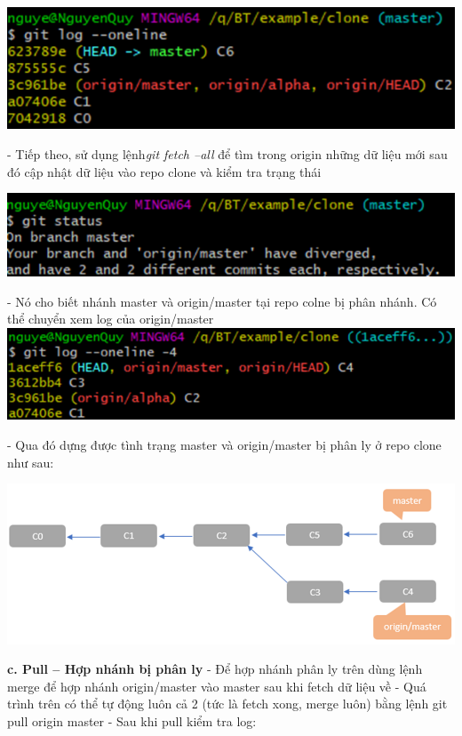 \documentclass[12pt,a4paper]{report}
\begin{document}
 	\label{fig:screenshot071}
 \vskip 0.4cm\vskip 0.4cm
 	\includegraphics[width=0.8\linewidth]{screenshot072}
 
 	\label{fig:screenshot072}
\vskip 0.4cm\vskip 0.4cm
 - Tiếp theo, sử dụng lệnh{\it git fetch --all} để  tìm trong origin những dữ liệu mới sau đó cập nhật dữ liệu vào repo clone và kiểm tra trạng thái\vskip 0.4cm

 	\includegraphics[width=0.8\linewidth]{screenshot073}
 
 	\label{fig:screenshot073}\vskip 0.4cm\vskip 0.4cm

 - Nó cho biết nhánh master và origin/master tại repo colne bị phân nhánh. Có thể chuyển xem log của origin/master
\vskip 0.4cm
 	\includegraphics[width=0.8\linewidth]{screenshot074}
 
 	\label{fig:screenshot074}
 \vskip 0.4cm\vskip 0.4cm
 - Qua đó dựng được tình trạng master và origin/master bị phân ly ở repo clone như sau:\vskip 0.4cm

 	\includegraphics[width=0.8\linewidth]{screenshot075}
 
 	\label{fig:screenshot075}
 \vskip 0.4cm\vskip 0.4cm
{\bf c. Pull – Hợp nhánh bị phân ly}\vskip 0.4cm
 - Để hợp nhánh phân ly trên dùng lệnh merge để hợp nhánh origin/master vào master sau khi fetch dữ liệu về\vskip 0.4cm
 - Quá trình trên có thể tự động luôn cả 2 (tức là fetch xong, merge luôn) bằng lệnh git pull origin master\vskip 0.4cm
 -  Sau khi pull kiểm tra log:\vskip 0.4cm
 
\end{document}
